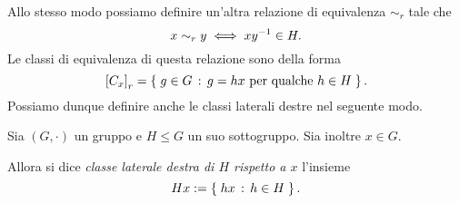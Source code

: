 Allo stesso modo possiamo definire un'altra relazione di equivalenza $\sim_r$ tale che \[
    x \sim_r y \iff xy^{-1} \in H.    
\] Le classi di equivalenza di questa relazione sono della forma \[
    \eqclass*{x}_r = \set{g \in G \suchthat g = hx \text{ per qualche } h \in H}.    
\] Possiamo dunque definire anche le classi laterali destre nel seguente modo.
\begin{definition}
    Sia $(G, \cdot)$ un gruppo e $H \leq G$ un suo sottogruppo. Sia inoltre $x \in G$.
    
    Allora si dice \emph{classe laterale destra di $H$ rispetto a $x$} l'insieme \[
        Hx := \left\{\;hx \,:\, h \in H\;\right\}. 
    \]
\end{definition}